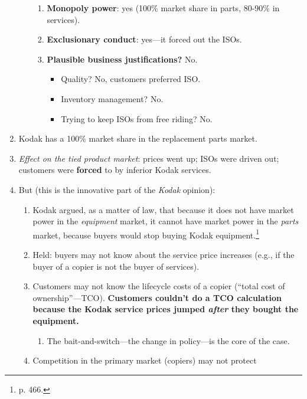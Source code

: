 \begin{enumerate}
\begin{enumerate}
\begin{enumerate}
            \item \textbf{Monopoly power}: yes (100\% market share in parts, 
            80-90\% in services).
            \item \textbf{Exclusionary conduct}: yes---it forced out the ISOs.
            \item \textbf{Plausible business justifications?} No.
            \begin{itemize}
                \item Quality? No, customers preferred ISO.
                \item Inventory management? No.
                \item Trying to keep ISOs from free riding? No.
            \end{itemize}
        \end{enumerate}
    \end{enumerate}
    \item Kodak has a 100\% market share in the replacement parts market.
    \item \emph{Effect on the tied product market}: prices went up; ISOs 
    were driven out; customers were \textbf{forced} to by inferior Kodak 
    services.
    \item But (this is the innovative part of the \emph{Kodak} opinion):
    \begin{enumerate}
        \item Kodak argued, as a matter of law, that because it does not 
        have market power in the \emph{equipment} market, it cannot have 
        market power in the \emph{parts} market, because buyers would stop 
        buying Kodak equipment.\footnote{p. 466.} 
        \item Held: buyers may not know about the service price increases 
        (e.g., if the buyer of a copier is not the buyer of services).
        \item Customers may not know the lifecycle costs of a copier 
        (``total cost of ownership''---TCO). \textbf{Customers couldn't do 
        a TCO calculation because the Kodak service prices jumped 
        \emph{after} they bought the equipment.}
        \begin{enumerate}
            \item The bait-and-switch---the change in policy---is the core 
            of the case.
        \end{enumerate}
        \item Competition in the primary market (copiers) may not protect 

\end{enumerate}
\end{enumerate}

